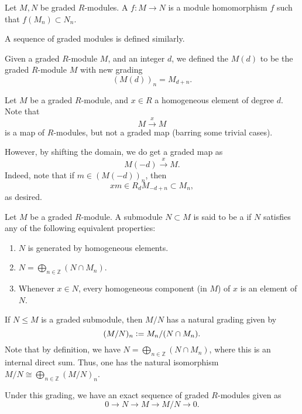 \documentclass[12pt]{article}
\begin{document}
\begin{defn}
	Let $M, N$ be graded $R$-modules. A  $f : M \to N$ is a module homomorphism $f$ such that $f(M_{n}) \subset N_{n}$. 

	A sequence of graded modules is defined similarly.
\end{defn}

\begin{defn}
	Given a graded $R$-module $M$, and an integer $d$, we defined the  $M(d)$ to be the graded $R$-module $M$ with new grading
	\begin{equation*} 
		(M(d))_{n} = M_{d + n}.
	\end{equation*}
\end{defn}

\begin{obs}
	Let $M$ be a graded $R$-module, and $x \in R$ a homogeneous element of degree $d$. Note that 
	\begin{equation*} 
		M \xrightarrow{x} M
	\end{equation*}
	is a map of $R$-modules, but not a graded map (barring some trivial cases). 

	However, by shifting the domain, we do get a graded map as
	\begin{equation*} 
		M(-d) \xrightarrow{x} M.
	\end{equation*}
	Indeed, note that if $m \in (M(-d))_{n}$, then
	\begin{equation*} 
		xm \in R_{d}M_{-d + n} \subset M_{n},
	\end{equation*}
	as desired.
\end{obs}

\begin{defn}
	Let $M$ be a graded $R$-module. A submodule $N \subset M$ is said to be a  if $N$ satisfies any of the following equivalent properties:
	\begin{enumerate}
		\item $N$ is generated by homogeneous elements.
		\item $N = \bigoplus_{n \in \mathbb{Z}} (N \cap M_{n})$.
		\item Whenever $x \in N$, every homogeneous component (in $M$) of $x$ is an element of $N$.
	\end{enumerate}
\end{defn}

\begin{obs}
	If $N \le M$ is a graded submodule, then $M/N$ has a natural grading given by
	\begin{equation*} 
		(M/N)_{n} \vcentcolon= M_{n}/(N \cap M_{n}).
	\end{equation*}
	Note that by definition, we have $N = \bigoplus_{n \in \mathbb{Z}} (N \cap M_{n})$, where this is an internal direct sum. Thus, one has the natural isomorphism $M/N \cong \bigoplus_{n \in \mathbb{Z}} (M/N)_{n}$.

	Under this grading, we have an exact sequence of graded $R$-modules given as
	\begin{equation*} 
		0 \to N \to M \to M/N \to 0.
	\end{equation*}
\end{obs}
\end{document}
